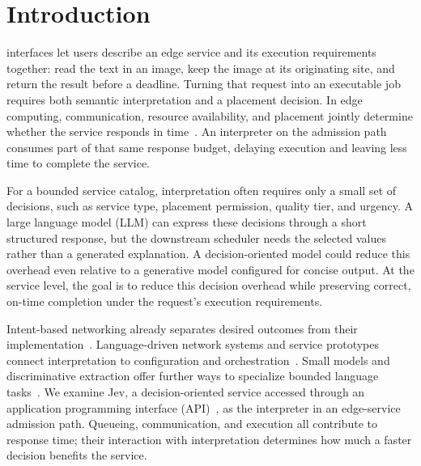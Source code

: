 \section{Introduction}
 interfaces let users describe an edge service
and its execution requirements together: read the text in an image, keep the
image at its originating site, and return the result before a deadline.
Turning that request into an executable job requires both semantic
interpretation and a placement decision. In edge computing, communication,
resource availability, and placement jointly determine whether the service
responds in time~\cite{shi2016edge,mao2017survey,santos2021lowlatency}.
An interpreter on the admission path consumes part of that same response
budget, delaying execution and leaving less time to complete the service.

For a bounded service catalog, interpretation often requires only a small
set of decisions, such as service type, placement permission, quality tier,
and urgency. A large language model (LLM) can express these decisions through
a short structured response, but the downstream scheduler needs the selected
values rather than a generated explanation. A decision-oriented model could
reduce this overhead even relative to a generative model configured for
concise output. At the service level, the goal is to reduce this decision
overhead while preserving correct, on-time completion under the request's
execution requirements.

Intent-based networking already separates desired outcomes from their
implementation~\cite{clemm2022intentbased}. Language-driven network systems
and service prototypes connect interpretation to configuration and
orchestration~\cite{jacobs2021hey,wang2024netconfeval,angi2025llnet,miyaoka2025chatdriven,nisiotis2026prompt}.
Small models and discriminative extraction offer further ways to specialize
bounded language tasks~\cite{belcak2025small,zaratiana2025gliner2}.
We examine Jev, a decision-oriented service accessed through an application
programming interface (API)~\cite{friedman2026jev}, as the interpreter in an
edge-service admission path. Queueing, communication, and execution all
contribute to response time; their interaction with interpretation determines
how much a faster decision benefits the service.

